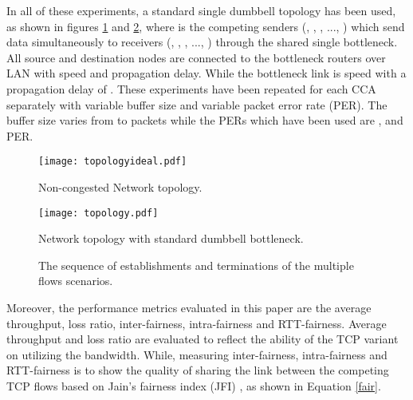 \documentclass[preprint,3p,times,twocolumn,authoryear]{elsarticle}
\begin{document}
In all of these experiments, a standard single dumbbell topology has been used, as shown in figures \ref{fig:topology-ideal} and \ref{fig:topology}, where  is the competing senders (, , , ..., ) which send data simultaneously to  receivers (, , , ..., ) through the shared single bottleneck. All source and destination nodes are connected to the bottleneck routers over LAN with  speed and  propagation delay. While the bottleneck link is  speed with a propagation delay of  \citep{Wang2013}. These experiments have been repeated for each CCA separately with variable buffer size and variable packet error rate (PER). The buffer size varies from  to  packets while the PERs which have been used are ,  and  PER. 

\begin{figure} [t!]
\centering
\texttt{[image: topologyideal.pdf]}
\caption{Non-congested Network topology.}
\label{fig:topology-ideal}
\end{figure}

\begin{figure} [t!]
\centering
\texttt{[image: topology.pdf]}
\caption{Network topology with standard dumbbell bottleneck.}
\label{fig:topology}
\end{figure}

\begin{figure} [t!]
	\centering
	\begin{center}
	\end{center}
	\caption{The sequence of establishments and terminations of the multiple flows scenarios.}
	\label{fig:multi-flows-sequence}
\end{figure}

Moreover, the performance metrics evaluated in this paper are the average throughput, loss ratio, inter-fairness, intra-fairness and RTT-fairness. Average throughput and loss ratio are evaluated to reflect the ability of the TCP variant on utilizing the bandwidth. While, measuring inter-fairness, intra-fairness and RTT-fairness is to show the quality of sharing the link between the competing TCP flows based on Jain's fairness index (JFI) \citep{jain1984}, as shown in Equation \eqref{fair}.
\end{document}
